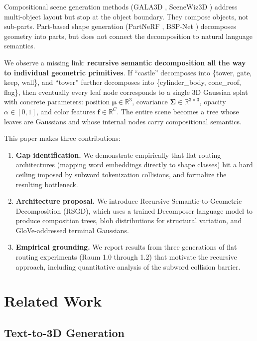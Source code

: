 \documentclass[11pt]{article}
\begin{document}
Compositional scene generation methods (GALA3D \cite{zhou2024}, SceneWiz3D \cite{zhang2024scenewiz3d}) address multi-object layout but stop at the object boundary. They compose objects, not sub-parts. Part-based shape generation (PartNeRF \cite{tertikas2023}, BSP-Net \cite{chen2020}) decomposes geometry into parts, but does not connect the decomposition to natural language semantics.

We observe a missing link: \textbf{recursive semantic decomposition all the way to individual geometric primitives}. If ``castle'' decomposes into \{tower, gate, keep, wall\}, and ``tower'' further decomposes into \{cylinder\_body, cone\_roof, flag\}, then eventually every leaf node corresponds to a single 3D Gaussian splat with concrete parameters: position $\boldsymbol{\mu} \in \mathbb{R}^3$, covariance $\boldsymbol{\Sigma} \in \mathbb{R}^{3 \times 3}$, opacity $\alpha \in [0,1]$, and color features $\mathbf{f} \in \mathbb{R}^C$. The entire scene becomes a tree whose leaves are Gaussians and whose internal nodes carry compositional semantics.

This paper makes three contributions:

\begin{enumerate}
    \item \textbf{Gap identification.} We demonstrate empirically that flat routing architectures (mapping word embeddings directly to shape classes) hit a hard ceiling imposed by subword tokenization collisions, and formalize the resulting bottleneck.

    \item \textbf{Architecture proposal.} We introduce Recursive Semantic-to-Geometric Decomposition (RSGD), which uses a trained Decomposer language model to produce composition trees, blob distributions for structural variation, and GloVe-addressed terminal Gaussians.

    \item \textbf{Empirical grounding.} We report results from three generations of flat routing experiments (Raum 1.0 through 1.2) that motivate the recursive approach, including quantitative analysis of the subword collision barrier.
\end{enumerate}

\section{Related Work}

\subsection{Text-to-3D Generation}
\end{document}
